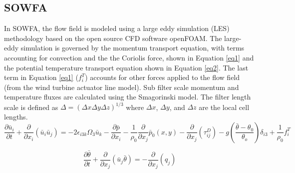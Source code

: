 \subsection{SOWFA}\label{section5-2-1}
In SOWFA, the flow field is modeled using a large eddy simulation (LES) methodology based on the open source CFD software openFOAM.\cite{churchfield2012} The large-eddy simulation is governed by the momentum transport equation, with terms accounting for convection and the the Coriolis force, shown in Equation \ref{eq1} and the potential temperature transport equation shown in Equation \ref{eq2}. The last term in Equation \ref{eq1} ($f_{i}^{T}$) accounts for other forces applied to the flow field (from the wind turbine actuator line model). Sub filter scale momentum and temperature fluxes are calculated using the Smagorinski model.\cite{smagorinsky1963} The filter length scale is defined as $\Delta =(\Delta x\Delta y\Delta z)^{1/3}$ where $\Delta x$, $\Delta y$, and $\Delta z$ are the local cell lengths. 
\begin{equation}
\frac{\partial \bar{u}_{i}}{\partial t} +\frac{\partial }{\partial x_{i}}(\bar{u}_{i}\bar{u}_{j})=-2\epsilon _{i3k}\Omega _{3}\bar{u}_{k}-\frac{\partial \bar{p}}{\partial x_{i}}-\frac{1}{\rho_0}\frac{\partial }{\partial x_j}\bar{p}_0(x,y)-\frac{\partial }{\partial x_j}(\tau_{ij}^{D} )-g\left( \frac{\bar{\theta }-\theta_0}{\theta_o}\right)\delta _{i3}+\frac{1}{\rho _0}f_{i}^{T}
 \label{eq1}
\end{equation}  

\begin{equation}
\frac{\partial \bar{\theta}}{\partial t}+\frac{\partial }{\partial x_j}(\bar{u}_j\bar\theta)=-\frac{\partial }{\partial x_j}(q_j)
 \label{eq2}
\end{equation}  



